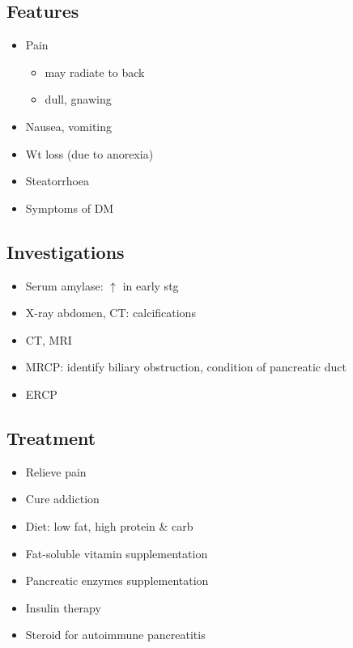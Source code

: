 \documentclass[
  14pt,
]{memoir}
\providecommand{\tightlist}{%
  \setlength{\itemsep}{0pt}\setlength{\parskip}{0pt}}
\begin{document}
\hypertarget{features-11}{%
\subsection{Features}\label{features-11}}

\begin{itemize}
\tightlist
\item
  Pain

  \begin{itemize}
  \tightlist
  \item
    may radiate to back
  \item
    dull, gnawing
  \end{itemize}
\item
  Nausea, vomiting
\item
  Wt loss (due to anorexia)
\item
  Steatorrhoea
\item
  Symptoms of DM
\end{itemize}

\hypertarget{investigations-10}{%
\subsection{Investigations}\label{investigations-10}}

\begin{itemize}
\tightlist
\item
  Serum amylase: \(\uparrow\) in early stg
\item
  X-ray abdomen, CT: calcifications
\item
  CT, MRI
\item
  MRCP: identify biliary obstruction, condition of pancreatic duct
\item
  ERCP
\end{itemize}

\hypertarget{treatment-10}{%
\subsection{Treatment}\label{treatment-10}}

\begin{itemize}
\tightlist
\item
  Relieve pain
\item
  Cure addiction
\item
  Diet: low fat, high protein \& carb
\item
  Fat-soluble vitamin supplementation
\item
  Pancreatic enzymes supplementation
\item
  Insulin therapy
\item
  Steroid for autoimmune pancreatitis
\end{itemize}
\end{document}
